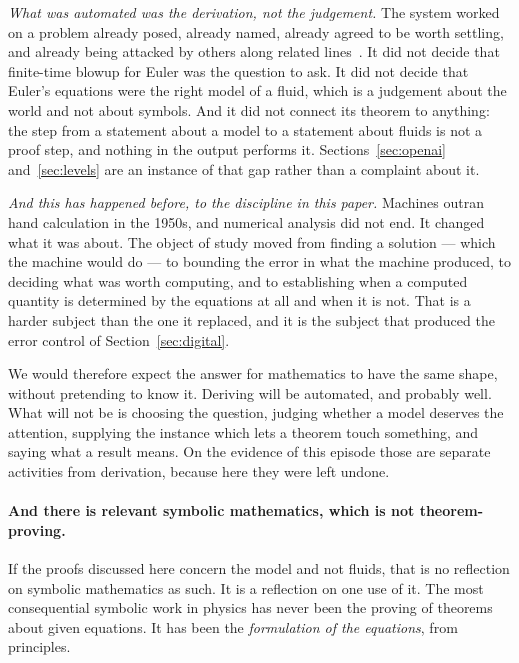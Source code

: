 \documentclass[11pt]{article}
\begin{document}
\emph{What was automated was the derivation, not the judgement.} The system worked on a problem
already posed, already named, already agreed to be worth settling, and already being attacked by
others along related lines~\cite{buckmaster}. It did not decide that finite-time blowup for Euler
was the question to ask. It did not decide that Euler's equations were the right model of a fluid,
which is a judgement about the world and not about symbols. And it did not connect its theorem to
anything: the step from a statement about a model to a statement about fluids is not a proof step,
and nothing in the output performs it. Sections~\ref{sec:openai} and~\ref{sec:levels} are an
instance of that gap rather than a complaint about it.

\emph{And this has happened before, to the discipline in this paper.} Machines outran hand
calculation in the 1950s, and numerical analysis did not end. It changed what it was about. The
object of study moved from finding a solution --- which the machine would do --- to bounding the
error in what the machine produced, to deciding what was worth computing, and to establishing when a
computed quantity is determined by the equations at all and when it is not. That is a harder subject
than the one it replaced, and it is the subject that produced the error control of
Section~\ref{sec:digital}.

We would therefore expect the answer for mathematics to have the same shape, without pretending to
know it. Deriving will be automated, and probably well. What will not be is choosing the question,
judging whether a model deserves the attention, supplying the instance which lets a theorem touch
something, and saying what a result means. On the evidence of this episode those are separate
activities from derivation, because here they were left undone.

\paragraph{And there is relevant symbolic mathematics, which is not theorem-proving.} If the proofs
discussed here concern the model and not fluids, that is no reflection on symbolic mathematics as
such. It is a reflection on one use of it. The most consequential symbolic work in physics has never
been the proving of theorems about given equations. It has been the \emph{formulation of the
equations}, from principles.
\end{document}
